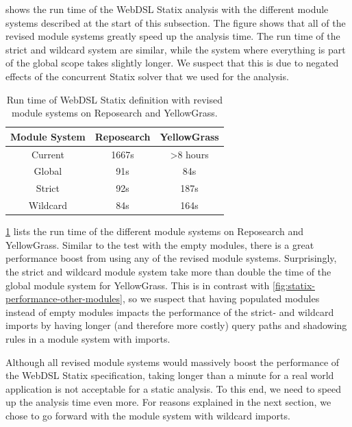        shows the run time of the WebDSL Statix analysis with the different module systems described at the start of this subsection. The figure shows that all of the revised module systems greatly speed up the analysis time. The run time of the strict and wildcard system are similar, while the system where everything is part of the global scope takes slightly longer. We suspect that this is due to negated effects of the concurrent Statix solver that we used for the analysis.

      \begin{table}[h]
        \centering
        \begin{tabular}{ | c || c | c | }
          \hline
          Module System & Reposearch & YellowGrass \\
          \hline
          Current & 1667s & >8 hours \\
          \hline
          Global & 91s & 84s \\
          \hline
          Strict & 92s & 187s \\
          \hline
          Wildcard & 84s & 164s \\
          \hline
        \end{tabular}
        \caption{\label{tbl:statix-performance-other-modules-rs-yg}Run time of WebDSL Statix definition with revised module systems on Reposearch and YellowGrass.}
      \end{table}

      \cref{tbl:statix-performance-other-modules-rs-yg} lists the run time of the different module systems on Reposearch and YellowGrass. Similar to the test with the empty modules, there is a great performance boost from using any of the revised module systems. Surprisingly, the strict and wildcard module system take more than double the time of the global module system for YellowGrass. This is in contrast with \cref{fig:statix-performance-other-modules}, so we suspect that having populated modules instead of empty modules impacts the performance of the strict- and wildcard imports by having longer (and therefore more costly) query paths and shadowing rules in a module system with imports.

      Although all revised module systems would massively boost the performance of the WebDSL Statix specification, taking longer than a minute for a real world application is not acceptable for a static analysis. To this end, we need to speed up the analysis time even more. For reasons explained in the next section, we chose to go forward with the module system with wildcard imports.

